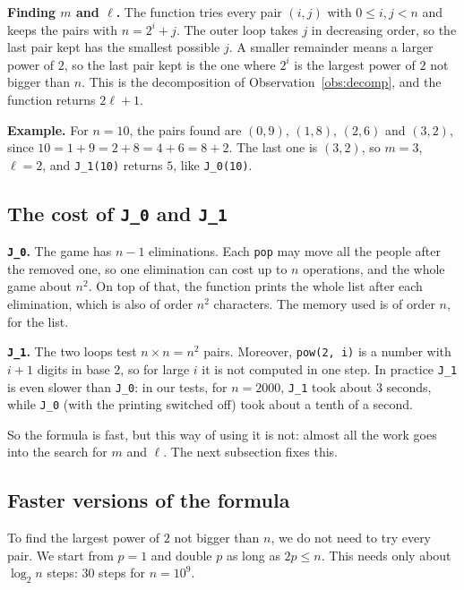 \textbf{Finding $m$ and $\ell$.} The function tries every pair $(i,j)$ with
$0\leq i,j<n$ and keeps the pairs with $n=2^i+j$. The outer loop takes $j$ in
decreasing order, so the last pair kept has the smallest possible $j$. A
smaller remainder means a larger power of $2$, so the last pair kept is the one
where $2^i$ is the largest power of $2$ not bigger than $n$. This is the
decomposition of Observation~\ref{obs:decomp}, and the function returns
$2\ell+1$.

\textbf{Example.} For $n=10$, the pairs found are $(0,9)$, $(1,8)$, $(2,6)$
and $(3,2)$, since $10=1+9=2+8=4+6=8+2$. The last one is $(3,2)$, so
$m=3$, $\ell=2$, and \texttt{J\_1(10)} returns $5$, like \texttt{J\_0(10)}.

\subsection{The cost of \texttt{J\_0} and \texttt{J\_1}}

\textbf{\texttt{J\_0}.} The game has $n-1$ eliminations. Each \texttt{pop}
may move all the people after the removed one, so one elimination can cost up
to $n$ operations, and the whole game about $n^2$. On top of that, the
function prints the whole list after each elimination, which is also of order
$n^2$ characters. The memory used is of order $n$, for the list.

\textbf{\texttt{J\_1}.} The two loops test $n\times n=n^2$ pairs. Moreover,
\texttt{pow(2, i)} is a number with $i+1$ digits in base $2$, so for large $i$
it is not computed in one step. In practice \texttt{J\_1} is even slower than
\texttt{J\_0}: in our tests, for $n=2000$, \texttt{J\_1} took about $3$
seconds, while \texttt{J\_0} (with the printing switched off) took about a
tenth of a second.

So the formula is fast, but this way of using it is not: almost all the work
goes into the search for $m$ and $\ell$. The next subsection fixes this.

\subsection{Faster versions of the formula}

To find the largest power of $2$ not bigger than $n$, we do not need to try
every pair. We start from $p=1$ and double $p$ as long as $2p\leq n$. This
needs only about $\log_2 n$ steps: $30$ steps for $n=10^9$.

